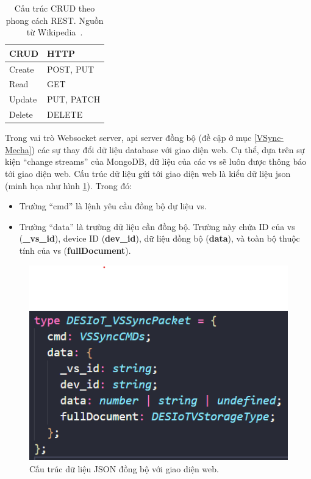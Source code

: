 \begin{table}[htp]
\caption{Cấu trúc CRUD theo phong cách REST. Nguồn từ Wikipedia~\cite{CRUD-REST-Service}.}

\label{tab:CRUD-REST-service}%
\begin{center}
\begin{tabular}{|l|l|}
\hline
\textbf{CRUD} & \textbf{HTTP} \\ \hline
Create        & POST, PUT     \\ \hline
Read          & GET           \\ \hline
Update        & PUT, PATCH    \\ \hline
Delete        & DELETE        \\ \hline
\end{tabular}
\end{center}
\end{table}

Trong vai trò Websocket server, \acrshort{api} server đồng bộ (đề cập ở mục \ref{VSync-Mecha}) các sự thay đổi dữ liệu database với giao diện web. Cụ thể, dựa trên sự kiện ``change streams'' của MongoDB, dữ liệu của các \acrshort{vs} sẽ luôn được thông báo tới giao diện web. Cấu trúc dữ liệu gửi tới giao diện web là kiểu dữ liệu \acrfull{json} (minh họa như hình \ref{fig:VSSync-JSON-model}). Trong đó:

\begin{itemize}
    \item Trường ``cmd'' là lệnh yêu cầu đồng bộ dự liệu \acrshort{vs}.
    \item Trường ``data'' là trường dữ liệu cần đồng bộ. Trường này chứa ID của \acrshort{vs} (\textbf{\_vs\_id}), device ID (\textbf{dev\_id}), dữ liệu đồng bộ (\textbf{data}), và toàn bộ thuộc tính của \acrshort{vs} (\textbf{fullDocument}).
\end{itemize}

\begin{figure}[htp]
\centering
\includegraphics[width=0.5\linewidth]{images/fig-Hardware-data-frame-struct.png}
\caption{Cấu trúc dữ liệu JSON đồng bộ với giao diện web.}
\label{fig:VSSync-JSON-model}
\end{figure}

